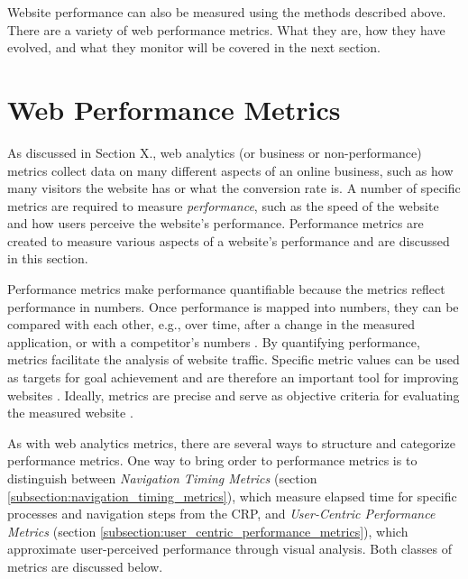 Website performance can also be measured using the methods described above.
There are a variety of web performance metrics.
What they are, how they have evolved, and what they monitor will be covered in the next section.



\section{Web Performance Metrics} %
\label{section:web_performance_metrics}



As discussed in Section X., web analytics (or business or non-performance) metrics collect data on many different aspects of an online business, such as how many visitors the website has or what the conversion rate is.
A number of specific metrics are required to measure \textit{performance}, such as the speed of the website and how users perceive the website's performance.
Performance metrics are created to measure various aspects of a website's performance and are discussed in this section.



Performance metrics make performance quantifiable because the metrics reflect performance in numbers.
Once performance is mapped into numbers, they can be compared with each other, e.g., over time, after a change in the measured application, or with a competitor's numbers \cite{2021MDNMeasuringPerformance}.
By quantifying performance, metrics facilitate the analysis of website traffic.
Specific metric values can be used as targets for goal achievement and are therefore an important tool for improving websites \cite{2009Jansen}.
Ideally, metrics are precise and serve as objective criteria for evaluating the measured website \cite{2019WaltonUserCentric}.



As with web analytics metrics, there are several ways to structure and categorize performance metrics.
One way to bring order to performance metrics is to distinguish between \textit{Navigation Timing Metrics} (section \ref{subsection:navigation_timing_metrics}), which measure elapsed time for specific processes and navigation steps from the CRP, and \textit{User-Centric Performance Metrics} (section \ref{subsection:user_centric_performance_metrics}), which approximate user-perceived performance through visual analysis.
Both classes of metrics are discussed below.

